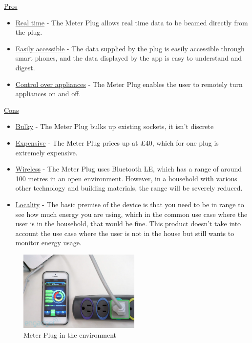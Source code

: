\documentclass[draft,preprint,12pt,3p]{elsarticle}
\begin{document}
\begin{center}
    \underline{Pros}
    \begin{itemize}
      \item \underline{Real time} - The Meter Plug allows real time data to be beamed directly from the plug. 
      \item \underline{Easily accessible} - The data supplied by the plug is easily accessible through smart phones, and the data displayed by the app is easy to understand and digest.
      \item \underline{Control over appliances} - The Meter Plug enables the user to remotely turn appliances on and off.
    \end{itemize}
    
    \underline{Cons}
    
    \begin{itemize}
      \item \underline{Bulky} - The Meter Plug bulks up existing sockets, it isn't discrete
      \item \underline{Expensive} - The Meter Plug prices up at \pounds40, which for one plug is extremely expensive. 
      \item \underline{Wireless} - The Meter Plug uses Bluetooth LE, which has a range of around 100 metres in an open environment. However, in a household with various other technology and building materials, the range will be severely reduced.
      \item \underline{Locality} - The basic premise of the device is that you need to be in range to see how much energy you are using, which in the common use case where the user is in the household, that would be fine. This product doesn't take into account the use case where the user is not in the house but still wants to monitor energy usage.
    \end{itemize}
    
\end{center}


\begin{figure}[h]
    \centering
    \includegraphics[width=6cm]{existing/meterplug}
    \caption {Meter Plug in the environment}
\end{figure}
\end{document}

